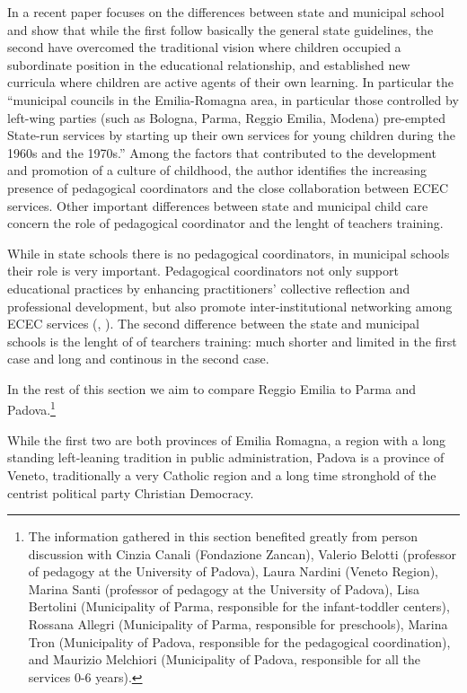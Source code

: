 \documentclass[12pt]{article}
\begin{document}
In a recent paper \cite{Lazzari2012a} focuses on the differences between state and municipal school and show that while the first follow basically the general state guidelines, the second have overcomed the traditional vision where children occupied a subordinate position in the educational relationship, and established new curricula where children are active agents of their own learning. In particular the ``municipal councils in the Emilia-Romagna area, in particular those controlled by left-wing parties (such as Bologna, Parma, Reggio Emilia, Modena) pre-empted State-run services by starting up their own services for young children during the 1960s and the 1970s.'' Among the factors that contributed to the development and promotion of a culture of childhood, the author identifies the increasing presence of pedagogical coordinators and the close collaboration between ECEC services. Other important differences between state and municipal child care concern the role of pedagogical coordinator and the lenght of teachers training.

While in state schools there is no pedagogical coordinators, in municipal schools their role is very important. Pedagogical coordinators not only support educational practices by enhancing practitioners' collective reflection and professional development, but also promote inter-institutional networking among ECEC services (\cite{Benedetti2009}, \cite{Musatti2012}). The second difference between the state and municipal schools is the lenght of of tearchers training: much shorter and limited in the first case and long and continous in the second case.

In the rest of this section we aim to compare Reggio Emilia to Parma and Padova.\footnote{The information gathered in this section benefited greatly from person discussion with Cinzia Canali (Fondazione Zancan), Valerio Belotti (professor of pedagogy at the University of Padova), Laura Nardini (Veneto Region), Marina Santi (professor of pedagogy at the University of Padova), Lisa Bertolini (Municipality of Parma, responsible for the infant-toddler centers), Rossana Allegri (Municipality of Parma, responsible for preschools), Marina Tron (Municipality of Padova, responsible for the pedagogical coordination), and Maurizio Melchiori (Municipality of Padova, responsible for all the services 0-6 years).} 

While the first two are both provinces of Emilia Romagna, a region with a long standing left-leaning tradition in public administration, Padova is a province of Veneto, traditionally a very Catholic region and a long time stronghold of the centrist political party Christian Democracy.
\end{document}
